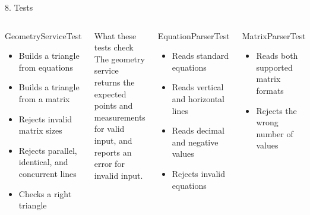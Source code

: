 \documentclass[aspectratio=169,11pt]{beamer}
\begin{document}
\begin{frame}{8. Tests}
  \begin{columns}[T]
      \begin{block}{GeometryServiceTest}
        \begin{itemize}
          \item Builds a triangle from equations
          \item Builds a triangle from a matrix
          \item Rejects invalid matrix sizes
          \item Rejects parallel, identical, and concurrent lines
          \item Checks a right triangle
        \end{itemize}
      \end{block}
      \begin{block}{What these tests check}
        The geometry service returns the expected points and measurements
        for valid input, and reports an error for invalid input.
      \end{block}
      \begin{exampleblock}{EquationParserTest}
        \begin{itemize}
          \item Reads standard equations
          \item Reads vertical and horizontal lines
          \item Reads decimal and negative values
          \item Rejects invalid equations
        \end{itemize}
      \end{exampleblock}
      \begin{exampleblock}{MatrixParserTest}
        \begin{itemize}
          \item Reads both supported matrix formats
          \item Rejects the wrong number of values
        \end{itemize}
      \end{exampleblock}
  \end{columns}
\end{frame}
\end{document}
